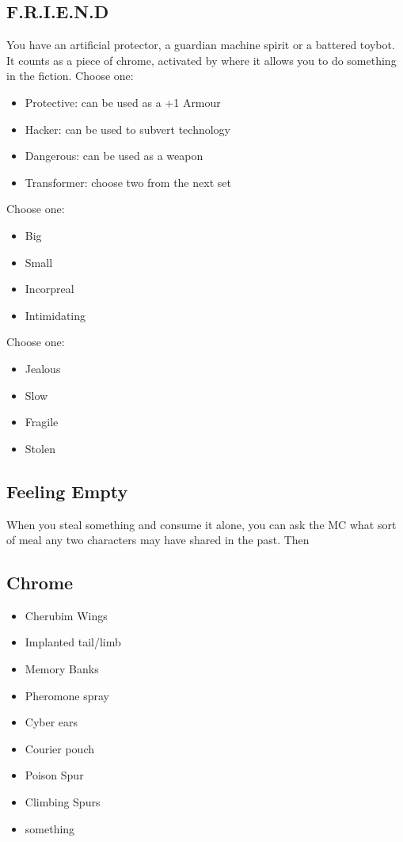 \documentclass{tufte-book}
\begin{document}
\subsection{F.R.I.E.N.D}
You have an artificial protector, a guardian machine spirit or a battered toybot. It counts as a piece of chrome, activated by  where it allows you to do something in the fiction.
Choose one: 
	\begin{itemize}
	\item Protective: can be used as a +1 Armour
	\item Hacker: can be used to subvert technology
	\item Dangerous: can be used as a weapon
	\item Transformer: choose two from the next set
	\end{itemize}
Choose one: 
	\begin{itemize}
	\item Big
	\item Small
	\item Incorpreal
	\item Intimidating
	\end{itemize}
Choose one: 
	\begin{itemize}
	\item Jealous
	\item Slow
	\item Fragile
	\item Stolen
	\end{itemize}

\subsection{Feeling Empty}
When you steal something and consume it alone, you can ask the MC what sort of meal any two characters may have shared in the past. Then 

\subsection{Chrome}
\begin{multicols}{3}
\begin{itemize}
\item Cherubim Wings
\item Implanted tail/limb
\item Memory Banks
\item Pheromone spray
\item Cyber ears
\item Courier pouch
\item Poison Spur
\item Climbing Spurs
\item something
\end{itemize}
\end{multicols}
\end{document}
